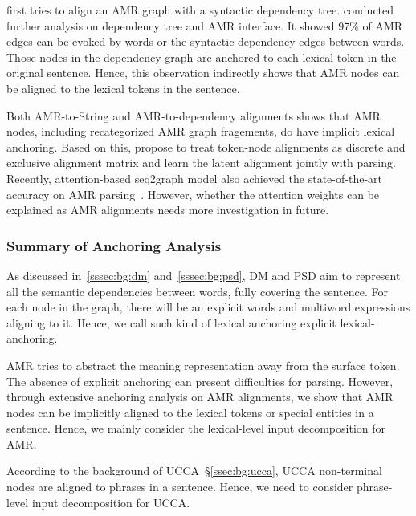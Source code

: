  \citet{chen2017unsupervised}
first tries to align an AMR graph with a syntactic dependency tree.
\citet{szubert2018structured} conducted further analysis on dependency
tree and AMR interface. It showed 97\% of AMR edges can be evoked by
words or the syntactic dependency edges between words.  Those nodes in
the dependency graph are anchored to each lexical token in the
original sentence. Hence, this observation indirectly shows that AMR
nodes can be aligned to the lexical tokens in the sentence.

Both AMR-to-String and AMR-to-dependency alignments shows that AMR
nodes, including recategorized AMR graph fragements, do have implicit
lexical anchoring. Based on this, \citet{lyu2018amr} propose to treat
token-node alignments as discrete and exclusive alignment matrix and
learn the latent alignment jointly with parsing. Recently,
attention-based seq2graph model also achieved the state-of-the-art
accuracy on AMR parsing~\citep{zhang-etal-2018-stog}.  However, whether
the attention weights can be explained as AMR alignments needs more
investigation in future.

\subsubsection{Summary of Anchoring Analysis}
\label{sssec:lex-phr:sum-anchoring}

As discussed in~\autoref{sssec:bg:dm} and~\autoref{sssec:bg:psd}, DM and PSD aim to
represent all the semantic dependencies between words, fully
covering the sentence. For each node in the graph, there will be an
explicit words and multiword expressions aligning to it. Hence, we call such
kind of lexical anchoring explicit lexical-anchoring.

AMR tries to abstract the meaning representation away from the surface
token. The absence of explicit anchoring can present difficulties for
parsing. However, through extensive anchoring analysis on AMR
alignments, we show that AMR nodes can be implicitly aligned to the
lexical tokens or special entities in a sentence. Hence, we mainly
consider the lexical-level input decomposition for AMR.

 According to the
background of UCCA~\S\ref{ssec:bg:ucca}, UCCA non-terminal nodes are
aligned to phrases in a sentence. Hence, we need to consider
phrase-level input decomposition for UCCA.


